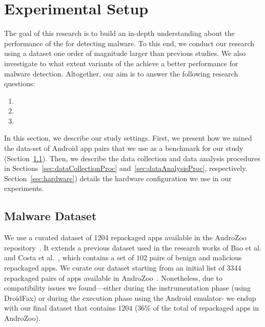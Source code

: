 \section{Experimental Setup}\label{sec:experimentalSetup}

The goal of this research is to build an in-depth understanding about
the performance of the \mas for detecting malware. To this
end, we conduct our research using a dataset one order of magnitude
larger than previous studies. We also investigate to what
extent variants of the \mas achieve a better performance
for malware detection. Altogether, our
aim is to answer the following research questions:

\begin{enumerate}[(RQ1)]
\item \rqa
\item \rqb
\item \rqc  
\end{enumerate}

In this section, we describe our study settings. First, we present how we mined the data-set of Android app pairs that we
use as a benchmark for our study (Section~\ref{sec:dataset}).  Then, we describe the data collection and
data analysis procedures in Sections~\ref{sec:dataCollectionProc} and~\ref{sec:dataAnalysisProc},
respectively. Section~\ref{sec:hardware}) details the hardware configuration we use in our
experiments.


\subsection{Malware Dataset}\label{sec:dataset}

We use a curated dataset of \num{1204} repackaged apps available in the AndroZoo repository~\cite{DBLP:conf/msr/AllixBKT16}.
It extends a previous dataset used in the research works of Bao et al. and Costa et al.~\cite{DBLP:conf/wcre/BaoLL18,DBLP:conf/scam/CostaMCMVBC20},
which contains a set of $102$ pairs of benign and malicious repackaged apps.
We curate our dataset starting from an initial list of \num{3344} repackaged pairs of apps available in AndroZoo~\cite{DBLP:conf/msr/AllixBKT16}.
Nonetheless, due to compatibility issues we found---either during the instrumentation phase (using DroidFax) or during the execution
phase using the Android emulator- we endup with our final dataset that contains $1204$ (36\% of the total of repackaged apps in
AndroZoo).

